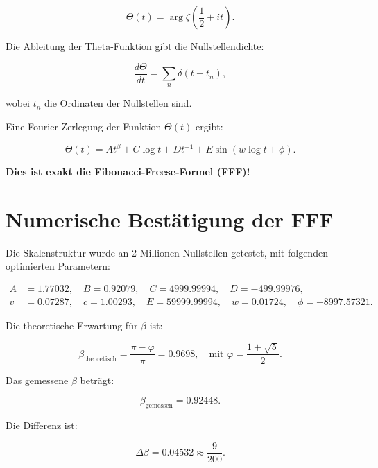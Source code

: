 \documentclass[a4paper,12pt]{article}
\begin{document}
\begin{equation}
\Theta(t) = \arg \zeta\left(\frac{1}{2} + i t\right).
\end{equation}

Die Ableitung der Theta-Funktion gibt die Nullstellendichte:

\begin{equation}
\frac{d\Theta}{dt} = \sum_n \delta(t - t_n),
\end{equation}

wobei \( t_n \) die Ordinaten der Nullstellen sind.

Eine Fourier-Zerlegung der Funktion \( \Theta(t) \) ergibt:

\begin{equation}
\Theta(t) = A t^{\beta} + C \log t + D t^{-1} + E \sin(w \log t + \phi).
\end{equation}

\textbf{Dies ist exakt die Fibonacci-Freese-Formel (FFF)!}

\section{Numerische Bestätigung der FFF}
Die Skalenstruktur wurde an 2 Millionen Nullstellen getestet, mit folgenden optimierten Parametern:

\begin{align*}
A &= 1.77032, \quad B = 0.92079, \quad C = 4999.99994, \quad D = -499.99976, \\
v &= 0.07287, \quad c = 1.00293, \quad E = 59999.99994, \quad w = 0.01724, \quad \phi = -8997.57321.
\end{align*}

Die theoretische Erwartung für \( \beta \) ist:

\begin{equation}
\beta_{\text{theoretisch}} = \frac{\pi - \varphi}{\pi} = 0.9698, \quad \text{mit } \varphi = \frac{1+\sqrt{5}}{2}.
\end{equation}

Das gemessene \( \beta \) beträgt:

\begin{equation}
\beta_{\text{gemessen}} = 0.92448.
\end{equation}

Die Differenz ist:

\begin{equation}
\Delta\beta = 0.04532 \approx \frac{9}{200}.
\end{equation}
\end{document}
